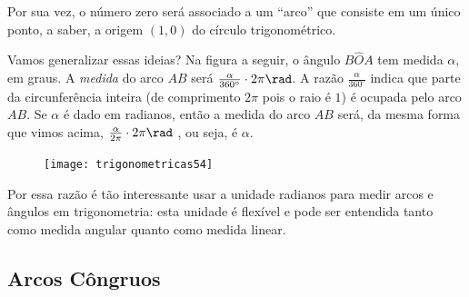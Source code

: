 Por sua vez, o número zero será associado a um “arco”{} que consiste em um único ponto, a saber, a origem $(1,0)$ do círculo trigonométrico.

Vamos generalizar essas ideias? Na figura a seguir, o ângulo ${B\hat{O}A}$ tem medida $\alpha$, em graus. A \textit{medida} do arco $AB$ será  $\frac{\alpha}{360^{\circ}}\cdot2\pi\rad$. A razão $\frac{\alpha}{360^{\circ}}$ indica que parte da circunferência inteira (de comprimento $2\pi$ pois o raio é $1$) é ocupada pelo arco $AB$. Se $\alpha$ é dado em radianos, então a medida do arco $AB$ será, da mesma forma que vimos acima, $\frac{\alpha}{2\pi}\cdot2\pi\rad$ , ou seja, é $\alpha$.

\begin{figure}[H]
\centering

\texttt{[image: trigonometricas54]}
\end{figure}

Por essa razão é tão interessante usar a unidade radianos para medir arcos e ângulos em trigonometria: esta unidade é flexível e pode ser entendida tanto como medida angular quanto como medida linear.

\subsection{Arcos Côngruos}

